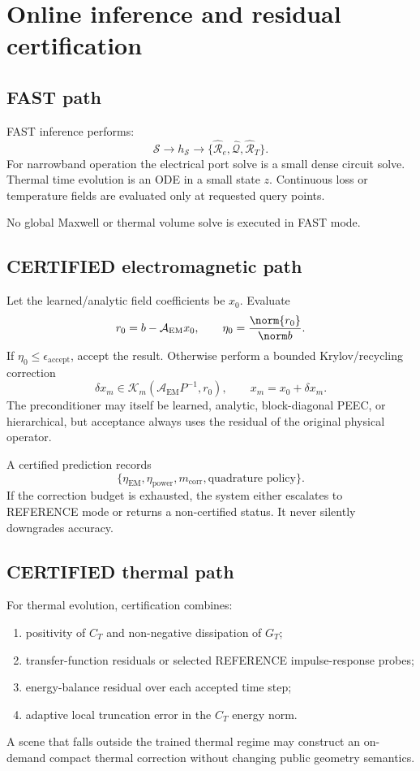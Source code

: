 \section{Online inference and residual certification}

\subsection{FAST path}

FAST inference performs:
\[
 \mathcal S
 \longrightarrow
 h_{\mathcal S}
 \longrightarrow
 \{\widehat{\mathcal R}_e,
   \widehat{\mathcal Q},
   \widehat{\mathcal R}_T\}.
\]
For narrowband operation the electrical port solve is a small dense circuit
solve. Thermal time evolution is an ODE in a small state $z$. Continuous loss
or temperature fields are evaluated only at requested query points.

No global Maxwell or thermal volume solve is executed in FAST mode.

\subsection{CERTIFIED electromagnetic path}

Let the learned/analytic field coefficients be $x_0$. Evaluate
\[
 r_0=b-\mathcal A_{\mathrm{EM}}x_0,\qquad
 \eta_0=\frac{\norm{r_0}}{\norm b}.
\]
If $\eta_0\le\epsilon_{\mathrm{accept}}$, accept the result. Otherwise perform a
bounded Krylov/recycling correction
\[
 \delta x_m\in
 \mathcal K_m(\mathcal A_{\mathrm{EM}}P^{-1},r_0),
 \qquad x_m=x_0+\delta x_m.
\]
The preconditioner may itself be learned, analytic, block-diagonal PEEC, or
hierarchical, but acceptance always uses the residual of the original physical
operator.

A certified prediction records
\[
 \{\eta_{\mathrm{EM}},
   \eta_{\mathrm{power}},
   m_{\mathrm{corr}},
   \text{quadrature policy}\}.
\]
If the correction budget is exhausted, the system either escalates to REFERENCE
mode or returns a non-certified status. It never silently downgrades accuracy.

\subsection{CERTIFIED thermal path}

For thermal evolution, certification combines:
\begin{enumerate}
\item positivity of $C_T$ and non-negative dissipation of $G_T$;
\item transfer-function residuals or selected REFERENCE impulse-response probes;
\item energy-balance residual over each accepted time step;
\item adaptive local truncation error in the $C_T$ energy norm.
\end{enumerate}
A scene that falls outside the trained thermal regime may construct an
on-demand compact thermal correction without changing public geometry
semantics.

